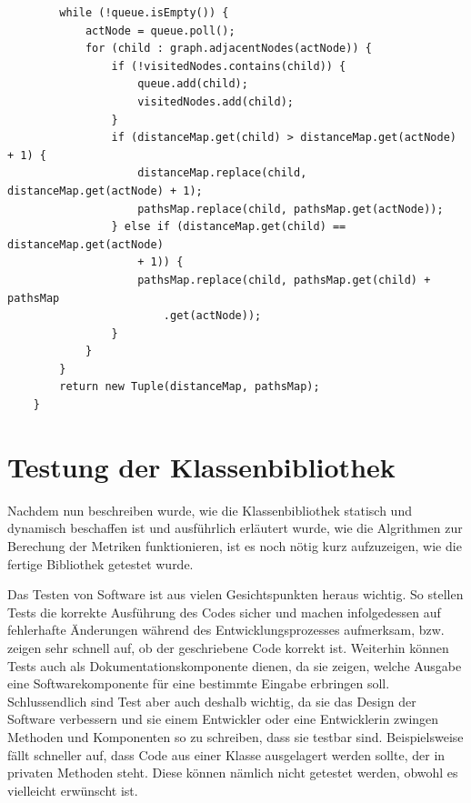 \documentclass[a4paper,12pt,ngerman,chapterprefix=false,listof=totoc,bibliography=totoc]{scrreprt}
\begin{document}
{{{\begin{lstlisting}
		while (!queue.isEmpty()) {
			actNode = queue.poll();
			for (child : graph.adjacentNodes(actNode)) {
				if (!visitedNodes.contains(child)) {
					queue.add(child);
					visitedNodes.add(child);
				}
				if (distanceMap.get(child) > distanceMap.get(actNode) + 1) {
					distanceMap.replace(child, distanceMap.get(actNode) + 1);
					pathsMap.replace(child, pathsMap.get(actNode));
				} else if (distanceMap.get(child) == distanceMap.get(actNode) 
					+ 1)) {
					pathsMap.replace(child, pathsMap.get(child) + pathsMap
						.get(actNode));
				}
			}
		}
		return new Tuple(distanceMap, pathsMap);
	}
\end{lstlisting}
}
\section{Testung der Klassenbibliothek}
{
Nachdem nun beschreiben wurde, wie die Klassenbibliothek statisch und dynamisch beschaffen ist und ausführlich erläutert wurde, wie die Algrithmen zur Berechung der Metriken funktionieren, ist es noch nötig kurz aufzuzeigen, wie die fertige Bibliothek getestet wurde.

Das Testen von Software ist aus vielen Gesichtspunkten heraus wichtig. So stellen Tests die korrekte Ausführung des Codes sicher und machen infolgedessen auf fehlerhafte Änderungen während des Entwicklungsprozesses aufmerksam, bzw. zeigen sehr schnell auf, ob der geschriebene Code korrekt ist. Weiterhin können Tests auch als Dokumentationskomponente dienen, da sie zeigen, welche Ausgabe eine Softwarekomponente für eine bestimmte Eingabe erbringen soll. Schlussendlich sind Test aber auch deshalb wichtig, da sie das Design der Software verbessern und sie einem Entwickler oder eine Entwicklerin zwingen Methoden und Komponenten so zu schreiben, dass sie testbar sind. Beispielsweise fällt schneller auf, dass Code aus einer Klasse ausgelagert werden sollte, der in privaten Methoden steht. Diese können nämlich nicht getestet werden, obwohl es vielleicht erwünscht ist. \cite{gulati_java_2017}

}}}
\end{document}
